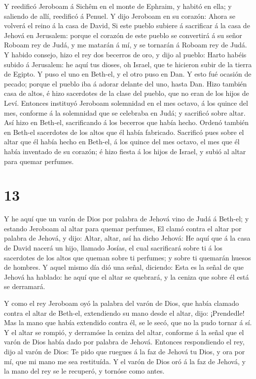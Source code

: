  Y reedificó Jeroboam á Sichêm en el monte de Ephraim, y
habitó en ella; y saliendo de allí, reedificó á Penuel.  Y
dijo Jeroboam en su corazón: Ahora se volverá el reino á la casa de
David,  Si este pueblo subiere á sacrificar á la casa de
Jehová en Jerusalem: porque el corazón de este pueblo se convertirá á su
señor Roboam rey de Judá, y me matarán á mí, y se tornarán á Roboam rey
de Judá.  Y habido consejo, hizo el rey dos becerros de
oro, y dijo al pueblo: Harto habéis subido á Jerusalem: he aquí tus
dioses, oh Israel, que te hicieron subir de la tierra de Egipto.
 Y puso el uno en Beth-el, y el otro puso en Dan.
 Y esto fué ocasión de pecado; porque el pueblo iba á
adorar delante del uno, hasta Dan.  Hizo también casa de
altos, é hizo sacerdotes de la clase del pueblo, que no eran de los
hijos de Leví.  Entonces instituyó Jeroboam solemnidad en
el mes octavo, á los quince del mes, conforme á la solemnidad que se
celebraba en Judá; y sacrificó sobre altar. Así hizo en Beth-el,
sacrificando á los becerros que había hecho. Ordenó también en Beth-el
sacerdotes de los altos que él había fabricado.  Sacrificó
pues sobre el altar que él había hecho en Beth-el, á los quince del mes
octavo, el mes que él había inventado de su corazón; é hizo fiesta á los
hijos de Israel, y subió al altar para quemar perfumes.

\hypertarget{section-12}{%
\section{13}\label{section-12}}

 Y he aquí que un varón de Dios por palabra de Jehová vino
de Judá á Beth-el; y estando Jeroboam al altar para quemar perfumes,
 El clamó contra el altar por palabra de Jehová, y dijo:
Altar, altar, así ha dicho Jehová: He aquí que á la casa de David nacerá
un hijo, llamado Josías, el cual sacrificará sobre ti á los sacerdotes
de los altos que queman sobre ti perfumes; y sobre ti quemarán huesos de
hombres.  Y aquel mismo día dió una señal, diciendo: Esta es
la señal de que Jehová ha hablado: he aquí que el altar se quebrará, y
la ceniza que sobre él está se derramará.

 Y como el rey Jeroboam oyó la palabra del varón de Dios,
que había clamado contra el altar de Beth-el, extendiendo su mano desde
el altar, dijo: ¡Prendedle! Mas la mano que había extendido contra él,
se le secó, que no la pudo tornar á sí.  Y el altar se
rompió, y derramóse la ceniza del altar, conforme á la señal que el
varón de Dios había dado por palabra de Jehová.  Entonces
respondiendo el rey, dijo al varón de Dios: Te pido que ruegues á la faz
de Jehová tu Dios, y ora por mí, que mi mano me sea restituída. Y el
varón de Dios oró á la faz de Jehová, y la mano del rey se le recuperó,
y tornóse como antes.

